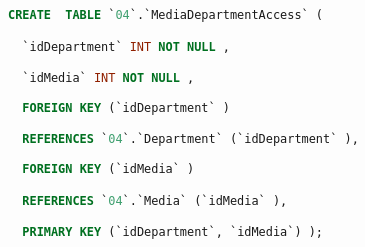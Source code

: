 \begin{lstlisting}[language=SQL,breaklines=true, label=createMediaDepartmentAccess, caption=Create MediaDepartmentAccess]
CREATE  TABLE `04`.`MediaDepartmentAccess` (

  `idDepartment` INT NOT NULL ,

  `idMedia` INT NOT NULL ,
  
  FOREIGN KEY (`idDepartment` )

  REFERENCES `04`.`Department` (`idDepartment` ),
  
  FOREIGN KEY (`idMedia` )

  REFERENCES `04`.`Media` (`idMedia` ),

  PRIMARY KEY (`idDepartment`, `idMedia`) );

\end{lstlisting}
